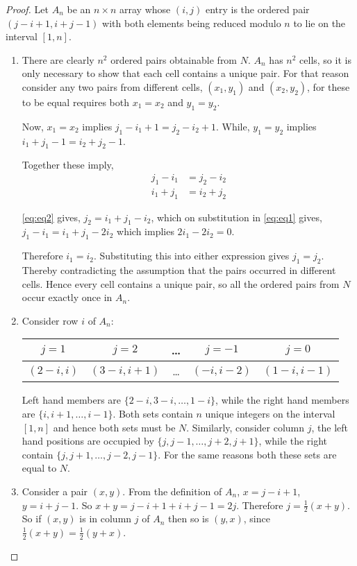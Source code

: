 \begin{proof}
Let $A_{n}$ be an $n \times n$ array whose $(i, j)$ entry is the ordered pair $(j - i + 1, i + j - 1)$ with both elements being reduced modulo $n$ to lie on the interval $[1, n]$.
\begin{enumerate}
  \item{
    There are clearly $n^{2}$ ordered pairs obtainable from $N$.
    $A_{n}$ has $n^{2}$ cells, so it is only necessary to show that each cell contains a unique pair.
    For that reason consider any two pairs from different cells, $(x_1, y_1)$ and $(x_2, y_2)$, for these to be equal requires both $x_1 = x_2$ and $y_1 = y_2$.

    Now, $x_1 = x_2$ implies $j_1-i_1 + 1 = j_2-i_2+1$.
    While, $y_1 = y_2$ implies $i_1 + j_1 - 1 = i_2 + j_2 - 1$.

     Together these imply,
     \begin{align}
       j_1 - i_1 &= j_2 - i_2 \label{eq:eq1} \\
       i_1 + j_1 &= i_2 + j_2 \label{eq:eq2}
     \end{align}

     \eqref{eq:eq2} gives, $j_2 = i_1 + j_1 - i_2$, which on substitution in \eqref{eq:eq1} gives, $j_1 - i_1 = i_1 + j_1 - 2i_2$ which implies $2i_1 - 2i_2 = 0$.
     
     Therefore $i_1 = i_2$.
     Substituting this into either expression gives $j_1 = j_2$.
     Thereby contradicting the assumption that the pairs occurred in different cells.
     Hence every cell contains a unique pair, so all the ordered pairs from $N$ occur exactly once in $A_n$.
  }
  \item{
    Consider row $i$ of $A_n$:

    \begin{tabular}{ccccc}
          $j = 1$   &     $j = 2$      & \ldots & $j = - 1$     &     $j = 0$      \\ \hline
       $(2 - i, i)$ & $(3 - i, i + 1)$ & \ldots & $(-i, i - 2)$ & $(1 - i, i - 1)$ 
    \end{tabular}

    Left hand members are $\{2-i, 3-i, \ldots, 1-i\}$, while the right hand members are $\{i, i + 1, \ldots, i - 1\}$.
    Both sets contain $n$ unique integers on the interval $[1,n]$ and hence both sets must be $N$.
    Similarly, consider column $j$, the left hand positions are occupied by $\{j, j - 1, \ldots, j + 2, j + 1\}$, while the right contain $\{j, j + 1, \ldots, j - 2, j - 1\}$.
    For the same reasons both these sets are equal to $N$.
  }
  \item{
    Consider a pair $(x,y)$.
    From the definition of $A_n$, $x = j-i + 1$, $y = i + j - 1$.
    So $x + y = j - i + 1 + i + j - 1 = 2j$.
    Therefore $j = \frac{1}{2}(x + y)$.
    So if $(x, y)$ is in column $j$ of $A_n$ then so is $(y, x)$, since $\frac{1}{2}(x + y) = \frac{1}{2}(y + x)$.
  }
\end{enumerate}
\end{proof}

